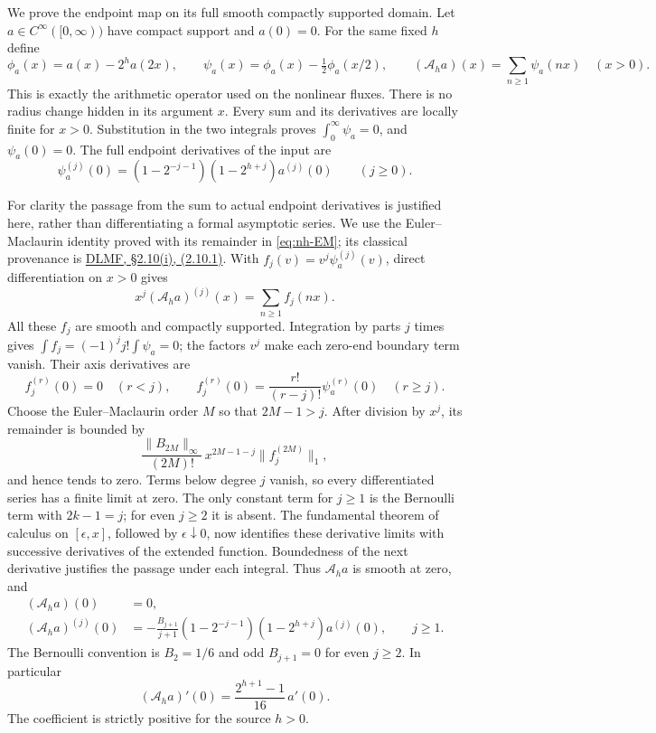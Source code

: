 We prove the endpoint map on its full smooth compactly supported
domain. Let \(a\in C^\infty([0,\infty))\) have compact support and
\(a(0)=0\). For the same fixed \(h\) define
\[
 \phi_a(x)=a(x)-2^h a(2x),\qquad
 \psi_a(x)=\phi_a(x)-\tfrac12\phi_a(x/2),\qquad
 (\mathcal A_h a)(x)=\sum_{n\ge1}\psi_a(nx)\quad(x>0).
\]
This is exactly the arithmetic operator used on the nonlinear fluxes.
There is no radius change hidden in its argument \(x\).
Every sum and its derivatives are locally finite for \(x>0\).
Substitution in the two integrals proves
\(\int_0^\infty\psi_a=0\), and \(\psi_a(0)=0\).
The full endpoint derivatives of the input are
\begin{equation}\label{naj:psi-jet}
 \psi_a^{(j)}(0)
  =(1-2^{-j-1})(1-2^{h+j})a^{(j)}(0)\qquad(j\ge0).
\end{equation}

For clarity the passage from the sum to actual endpoint derivatives
is justified here, rather than differentiating a formal asymptotic
series. We use the Euler--Maclaurin identity proved with its remainder
in \eqref{eq:nh-EM}; its classical provenance is
\href{https://dlmf.nist.gov/2.10.E1}{DLMF, \S2.10(i), (2.10.1)}. With
\(f_j(v)=v^j\psi_a^{(j)}(v)\), direct differentiation on \(x>0\)
gives
\[
 x^j(\mathcal A_ha)^{(j)}(x)=\sum_{n\ge1}f_j(nx).
\]
All these \(f_j\) are smooth and compactly supported. Integration by
parts \(j\) times gives
\(\int f_j=(-1)^j j!\int\psi_a=0\); the factors \(v^j\) make
each zero-end boundary term vanish. Their axis derivatives are
\[
 f_j^{(r)}(0)=0\quad(r<j),\qquad
 f_j^{(r)}(0)=\frac{r!}{(r-j)!}\psi_a^{(r)}(0)\quad(r\ge j).
\]
Choose the Euler--Maclaurin order \(M\) so that \(2M-1>j\).
After division by \(x^j\), its remainder is bounded by
\[
 \frac{\|B_{2M}\|_\infty}{(2M)!}\,
 x^{2M-1-j}\|f_j^{(2M)}\|_1,
\]
and hence tends to zero. Terms below degree \(j\) vanish, so every
differentiated series has a finite limit at zero. The only constant
term for \(j\ge1\) is the Bernoulli term with \(2k-1=j\); for even
\(j\ge2\) it is absent. The fundamental theorem of calculus on
\([\epsilon,x]\), followed by \(\epsilon\downarrow0\), now identifies
these derivative limits with successive derivatives of the extended
function. Boundedness of the next derivative justifies the passage
under each integral. Thus \(\mathcal A_ha\) is smooth at zero, and
\begin{equation}\label{naj:all-jets}
 \begin{split}
 (\mathcal A_ha)(0)&=0,\\
 (\mathcal A_ha)^{(j)}(0)&=
 -\frac{B_{j+1}}{j+1}
 (1-2^{-j-1})(1-2^{h+j})a^{(j)}(0),\qquad j\ge1.
 \end{split}
\end{equation}
The Bernoulli convention is \(B_2=1/6\) and odd \(B_{j+1}=0\)
for even \(j\ge2\).
In particular
\begin{equation}\label{naj:first-map}
 (\mathcal A_ha)'(0)=
       \frac{2^{h+1}-1}{16}\,a'(0).
\end{equation}
The coefficient is strictly positive for the source \(h>0\).

